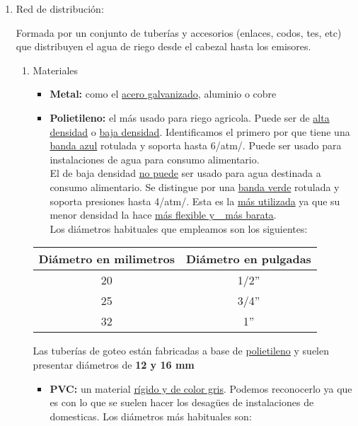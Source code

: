 \documentclass[a4paper,12pt,oneside]{article}
\begin{document}
\begin{enumerate}
\item Red de distribución:
\label{sec:orga6bf833}

Formada por un conjunto de tuberías y accesorios (enlaces, codos, tes, etc) que
distribuyen el agua de riego desde el cabezal hasta los emisores.\\

\begin{enumerate}
\item Materiales
\label{sec:org5b65467}

\begin{itemize}
\item \textbf{Metal:} como el \uline{acero galvanizado}, aluminio o cobre
\item \textbf{Polietileno:} el más usado para riego agricola. Puede ser de \uline{alta densidad}
o \uline{baja densidad}. Identificamos el primero por que tiene una \uline{banda azul}
rotulada y soporta hasta 6/atm/. Puede ser usado para instalaciones de agua
para consumo alimentario.\\
El de baja densidad \uline{no puede} ser usado para agua destinada a consumo
alimentario. Se distingue por una \uline{banda verde} rotulada y soporta presiones
hasta 4/atm/. Esta es la \uline{más utilizada} ya que su menor densidad la hace \uline{más
flexible y \_más barata}.\\

Los diámetros habituales que empleamos son los siguientes:\\
\end{itemize}
\begin{table}[h!]
    \centering  
    \begin{tabular}{|c|c|}
    \hline 
    Diámetro en milimetros&Diámetro en pulgadas\\
    \hline
    20&1/2''\\
    \hline
    25&3/4''\\
    \hline
    32&1''\\
    \hline
\end{tabular}
\end{table}
Las tuberías de goteo están fabricadas a base de \uline{polietileno} y suelen
presentar diámetros de \textbf{12 y 16 mm}
\begin{itemize}
\item \textbf{PVC:} un material \uline{rígido y de color gris}. Podemos reconocerlo ya que es con lo
que se suelen hacer los desagües de instalaciones de domesticas. Los diámetros
más habituales son:
\end{itemize}


\end{enumerate}
\end{enumerate}
\end{document}
